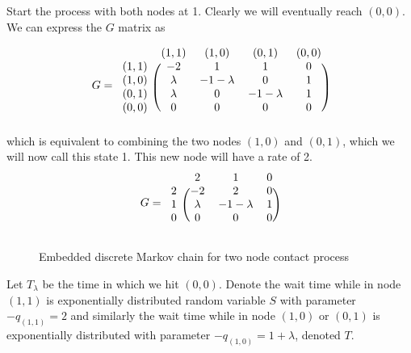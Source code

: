 \documentclass{article}
\theoremstyle{plain}
\theoremstyle{definition}
\theoremstyle{remark}
\begin{document}
Start the process with both nodes at 1.
Clearly we will eventually reach $(0,0)$.
We can express the $G$ matrix as

$$
G = \begin{blockarray}{ccccc}
    & (1,1) & (1,0) & (0,1) & (0,0)\\
    \begin{block}{c(cccc)}
        (1,1) & -2 & 1 & 1 & 0\\
        (1,0) & \lambda & - 1 - \lambda & 0 & 1\\
        (0,1) & \lambda & 0 & - 1 - \lambda & 1\\
        (0,0) & 0 & 0 & 0 & 0\\
    \end{block}
\end{blockarray}
$$
which is equivalent to combining the two nodes $(1,0)$ and $(0,1)$, which we will now call this state 1.
This new node will have a rate of 2.
$$
G = \begin{blockarray}{cccc}
    & 2 & 1 & 0\\
    \begin{block}{c(ccc)}
        2 & -2 & 2 & 0\\
        1 & \lambda & - 1 - \lambda & 1\\
        0 & 0 & 0 & 0\\
    \end{block}
\end{blockarray}
$$

\begin{figure}
    \centering
    \caption{Embedded discrete Markov chain for two node contact process}
    \label{fig:discrete_mc_two_contact}
\end{figure}

Let $T_\lambda$ be the time in which we hit $(0,0)$.
Denote the wait time while in node $(1,1)$ is exponentially distributed random variable $S$ with parameter $- q_{(1,1)} = 2$ and similarly the wait time while in node $(1,0)$ or $(0,1)$ is exponentially distributed with parameter $- q_{(1,0)} = 1 + \lambda$, denoted $T$.
\end{document}
